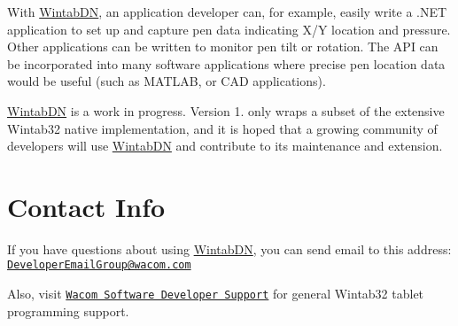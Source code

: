 With \mbox{\hyperlink{namespace_wintab_d_n}{Wintab\+DN}}, an application developer can, for example, easily write a .N\+ET application to set up and capture pen data indicating X/Y location and pressure. Other applications can be written to monitor pen tilt or rotation. The A\+PI can be incorporated into many software applications where precise pen location data would be useful (such as M\+A\+T\+L\+AB, or C\+AD applications).

\mbox{\hyperlink{namespace_wintab_d_n}{Wintab\+DN}} is a work in progress. Version 1. only wraps a subset of the extensive Wintab32 native implementation, and it is hoped that a growing community of developers will use \mbox{\hyperlink{namespace_wintab_d_n}{Wintab\+DN}} and contribute to its maintenance and extension.\hypertarget{index_contact_sec}{}\section{Contact Info}\label{index_contact_sec}
If you have questions about using \mbox{\hyperlink{namespace_wintab_d_n}{Wintab\+DN}}, you can send email to this address\+: \href{mailto:DeveloperEmailGroup@wacom.com}{\tt Developer\+Email\+Group@wacom.\+com}

Also, visit \href{http://wacomeng.com/windows/index.html}{\tt Wacom Software Developer Support} for general Wintab32 tablet programming support. 